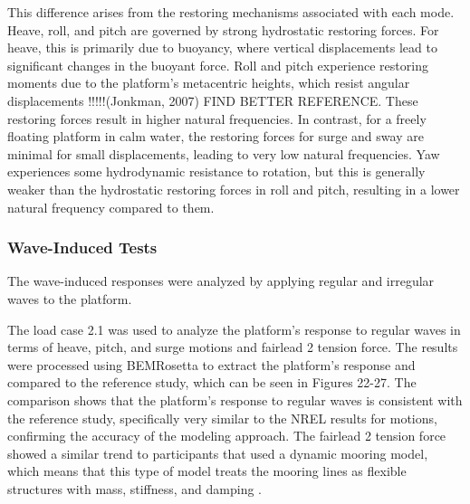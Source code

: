 \documentclass[a4paper]{article}
\begin{document}
This difference arises from the restoring mechanisms associated with each mode. Heave, roll, and pitch are governed by strong hydrostatic restoring forces. For heave, this is primarily due to buoyancy, where vertical displacements lead to significant changes in the buoyant force. Roll and pitch experience restoring moments due to the platform's metacentric heights, which resist angular displacements !!!!!(Jonkman, 2007) FIND BETTER REFERENCE. These restoring forces result in higher natural frequencies. In contrast, for a freely floating platform in calm water, the restoring forces for surge and sway are minimal for small displacements, leading to very low natural frequencies. Yaw experiences some hydrodynamic resistance to rotation, but this is generally weaker than the hydrostatic restoring forces in roll and pitch, resulting in a lower natural frequency compared to them. 


\subsubsection{Wave-Induced Tests}
\hspace*{0.5cm}The wave-induced responses were analyzed by applying regular and irregular waves to the platform. 
\vspace{0.5cm}

The load case 2.1 was used to analyze the platform's response to regular waves in terms of heave, pitch, and surge motions and fairlead 2 tension force. The results were processed using BEMRosetta to extract the platform's response and compared to the reference study, which can be seen in Figures 22-27. The comparison shows that the platform's response to regular waves is consistent with the reference study, specifically very similar to the NREL results for motions, confirming the accuracy of the modeling approach. The fairlead 2 tension force showed a similar trend to participants that used a dynamic mooring model, which means that this type of model treats the mooring lines as flexible structures with mass, stiffness, and damping .
\end{document}
